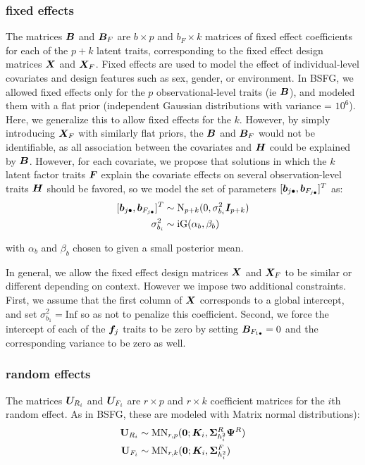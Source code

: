 \documentclass[11pt]{amsart}
\newcommand*{\B}[1]{\ifmmode\bm{#1}\else\textbf{#1}\fi}
\begin{document}
\subsubsection{fixed effects}
The matrices $\B{B}$ and $\B{B}_F$ are $b \times p$ and $b_F \times k$ matrices of fixed effect coefficients for each of the $p + k$ latent traits, corresponding to the fixed effect design matrices $\B{X}$ and $\B{X}_F$. Fixed effects are used to model the effect of individual-level covariates and design features such as sex, gender, or environment. In BSFG, we allowed fixed effects only for the $p$ observational-level traits (ie $\B{B}$), and modeled them with a flat prior (independent Gaussian distributions with variance = $10^6$). Here, we generalize this to allow fixed effects for the $k$. However, by simply introducing $\B{X}_F$ with similarly flat priors, the $\B{B}$ and $\B{B}_F$ would not be identifiable, as all association between the covariates and $\B{H}$ could be explained by $\B{B}$. However, for each covariate, we propose that solutions in which the $k$ latent factor traits $\B{F}$ explain the covariate effects on several observation-level traits $\B{H}$ should be favored, so we model the set of parameters $[\B{b}_{j\bullet}, \B{b}_{F_{j\bullet}}]^T$ as:
\begin{align}\begin{split}
[\B{b}_{j\bullet}, \B{b}_{F_{j\bullet}}]^T &\sim \mbox{N}_{p+k}(0,\sigma^2_{b_i}\B{I}_{p+k}) \\
\sigma^2_{b_i} &\sim \mbox{iG}(\alpha_b,\beta_b)
\end{split} \end{align}

\noindent with $\alpha_b$ and $\beta_b$ chosen to given a small posterior mean.

In general, we allow the fixed effect design matrices $\B{X}$ and $\B{X}_F$ to be similar or different depending on context. 
However we impose two additional constraints. First, we assume that the first column of $\B{X}$ corresponds to a global intercept, and set $\sigma^2_{b_1} = \mbox{Inf}$ so as not to penalize this coefficient. 
Second, we force the intercept of each of the $\B{f}_j$ traits to be zero by setting $\B{B}_{F_{1\bullet}} = 0$ and the corresponding variance to be zero as well.

\subsubsection{random effects}
The matrices $\B{U}_{R_i}$ and $\B{U}_{F_i}$ are $r \times p$ and $r \times k$ coefficient matrices for the $i$th random effect. As in BSFG, these are modeled with Matrix normal distributions):
\begin{align} \begin{split}
\B{U}_{R_i} &\sim \mbox{MN}_{r,p}(\B{0};\B{K}_i,\B{\Sigma}^R_{h^2_{i}}\B{\Psi}^R) \\
\B{U}_{F_i} &\sim \mbox{MN}_{r,k}(\B{0};\B{K}_i,\B{\Sigma}^F_{h^2_{i}})
\end{split} \end{align}
\end{document}
